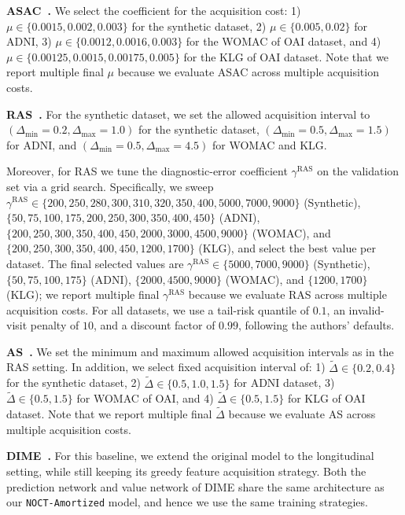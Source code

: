 \textbf{ASAC~\citep{yoon2019asac}.} We select the coefficient for the acquisition cost: 1) $\mu \in \{0.0015, 0.002, 0.003\}$ for the synthetic dataset, 2) $\mu \in \{0.005, 0.02\}$ for ADNI, 3) $\mu \in \{0.0012, 0.0016, 0.003\}$ for the WOMAC of OAI dataset, and 4) $\mu \in \{0.00125, 0.0015, 0.00175, 0.005\}$ for the KLG of OAI dataset. Note that we report multiple final $\mu$ because we evaluate ASAC across multiple acquisition costs.

\textbf{RAS~\citep{qin2024risk}.} For the synthetic dataset, we set the allowed acquisition interval to $(\Delta_{\min} = 0.2, \Delta_{\max} = 1.0)$ for the synthetic dataset, $(\Delta_{\min} = 0.5, \Delta_{\max} = 1.5)$ for ADNI, and $(\Delta_{\min} = 0.5, \Delta_{\max} = 4.5)$ for WOMAC and KLG. 

Moreover, for RAS we tune the diagnostic-error coefficient $\gamma^{\text{RAS}}$ on the validation set via a grid search. Specifically, we sweep $\gamma^{\text{RAS}} \in \{200,250,280,300,310,320,350,400,5000,7000,9000\}$ (Synthetic), $\{50,75,100,175,200,250,300,350,400,450\}$ (ADNI), $\{200,250,300,350,400,450,2000,3000,4500,9000\}$ (WOMAC), and $\{200,250,300,350,400,450,1200,1700\}$ (KLG), and select the best value per dataset. The final selected values are $\gamma^{\text{RAS}}\in\{5000,7000,9000\}$ (Synthetic), $\{50,75,100,175\}$ (ADNI), $\{2000,4500,9000\}$ (WOMAC), and $\{1200,1700\}$ (KLG); we report multiple final $\gamma^{\text{RAS}}$ because we evaluate RAS across multiple acquisition costs. For all datasets, we use a tail-risk quantile of $0.1$, an invalid-visit penalty of $10$, and a discount factor of $0.99$, following the authors' defaults.

\textbf{AS~\citep{qin2024risk}.} We set the minimum and maximum allowed acquisition intervals as in the RAS setting. In addition, we select fixed acquisition interval of: 1) $\tilde{\Delta} \in \{0.2, 0.4\}$ for the synthetic dataset, 2) $\tilde{\Delta} \in \{0.5, 1.0, 1.5\}$ for ADNI dataset, 3) $\tilde{\Delta} \in \{0.5, 1.5\}$ for WOMAC of OAI, and 4) $\tilde{\Delta} \in \{0.5, 1.5\}$ for KLG of OAI dataset. Note that we report multiple final $\tilde{\Delta}$ because we evaluate AS across multiple acquisition costs. 

\textbf{DIME~\citep{gadgil2023estimating}.} For this baseline, we extend the original model to the longitudinal setting, while still keeping its greedy feature acquisition strategy. 
Both the prediction network and value network of DIME share the same architecture as our \texttt{NOCT-Amortized} model, and hence we use the same training strategies. 

